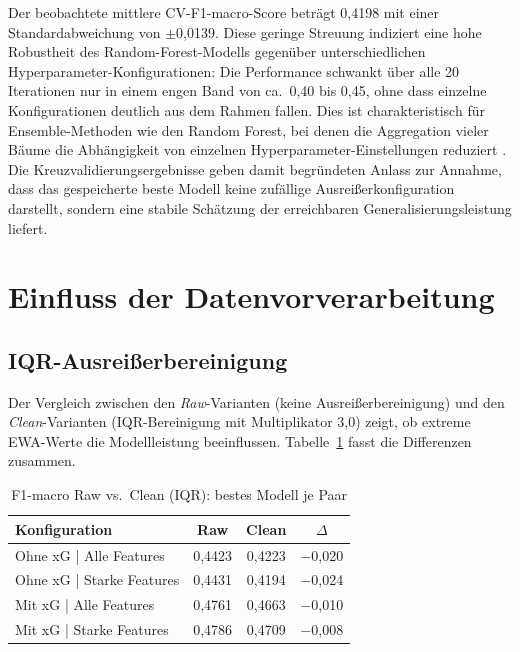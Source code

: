 Der beobachtete mittlere CV-F1-macro-Score beträgt 0,4198 mit einer
Standardabweichung von $\pm$0,0139. Diese geringe Streuung indiziert eine
hohe Robustheit des Random-Forest-Modells gegenüber unterschiedlichen
Hyperparameter-Konfigurationen: Die Performance schwankt über alle 20
Iterationen nur in einem engen Band von ca.\ 0,40 bis 0,45, ohne dass
einzelne Konfigurationen deutlich aus dem Rahmen fallen. Dies ist charakteristisch
für Ensemble-Methoden wie den Random Forest, bei denen die Aggregation
vieler Bäume die Abhängigkeit von einzelnen Hyperparameter-Einstellungen
reduziert \cite{Breiman2001}. Die Kreuzvalidierungsergebnisse geben damit
begründeten Anlass zur Annahme, dass das gespeicherte beste Modell keine
zufällige Ausreißerkonfiguration darstellt, sondern eine stabile Schätzung
der erreichbaren Generalisierungsleistung liefert.

\section{Einfluss der Datenvorverarbeitung}
\label{sec:eval-varianten}

\subsection{IQR-Ausreißerbereinigung}

Der Vergleich zwischen den \emph{Raw}-Varianten (keine Ausreißerbereinigung)
und den \emph{Clean}-Varianten (IQR-Bereinigung mit Multiplikator 3,0)
zeigt, ob extreme EWA-Werte die Modellleistung beeinflussen.
Tabelle~\ref{tab:iqr-vergleich} fasst die Differenzen zusammen.

\begin{table}[H]
    \centering
    \caption{F1-macro Raw vs.\ Clean (IQR): bestes Modell je Paar}
    \label{tab:iqr-vergleich}
    \begin{tabular}{l c c c}
        \toprule
        \textbf{Konfiguration} & \textbf{Raw} & \textbf{Clean} & \textbf{$\Delta$} \\
        \midrule
        Ohne xG | Alle Features    & 0,4423 & 0,4223 & $-$0,020 \\
        Ohne xG | Starke Features  & 0,4431 & 0,4194 & $-$0,024 \\
        Mit xG  | Alle Features    & 0,4761 & 0,4663 & $-$0,010 \\
        Mit xG  | Starke Features  & 0,4786 & 0,4709 & $-$0,008 \\
        \bottomrule
    \end{tabular}
\end{table}

